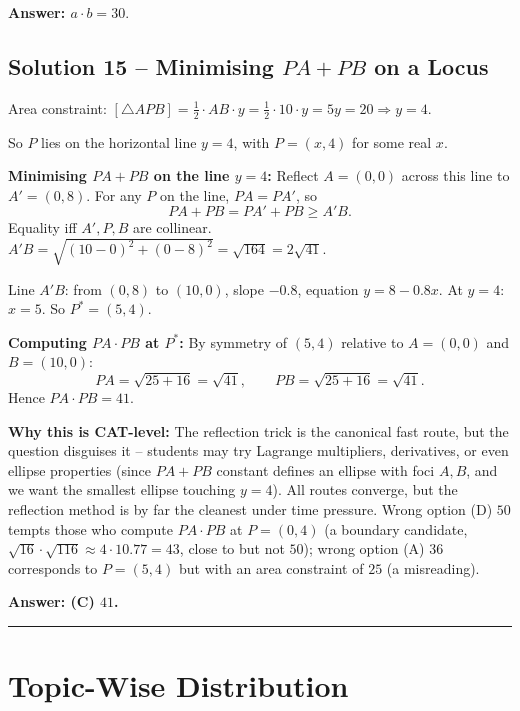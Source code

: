 \documentclass[11pt,a4paper]{article}
\begin{document}
\textbf{Answer: $a\cdot b = 30.$}

\medskip

\subsection*{Solution 15 -- Minimising $PA+PB$ on a Locus}
Area constraint: $[\triangle APB] = \tfrac{1}{2}\cdot AB \cdot y = \tfrac{1}{2}\cdot 10\cdot y = 5y = 20 \Rightarrow y = 4.$

So $P$ lies on the horizontal line $y=4$, with $P=(x,4)$ for some real $x$.

\textbf{Minimising $PA+PB$ on the line $y=4$:} Reflect $A=(0,0)$ across this line to $A'=(0,8)$. For any $P$ on the line, $PA = PA'$, so
\[
PA + PB = PA' + PB \ge A'B.
\]
Equality iff $A', P, B$ are collinear. $A'B = \sqrt{(10-0)^{2} + (0-8)^{2}} = \sqrt{164} = 2\sqrt{41}.$

Line $A'B$: from $(0,8)$ to $(10,0)$, slope $-0.8$, equation $y = 8 - 0.8x.$ At $y=4$: $x = 5.$ So $P^{*} = (5,4).$

\textbf{Computing $PA\cdot PB$ at $P^{*}$:} By symmetry of $(5,4)$ relative to $A=(0,0)$ and $B=(10,0)$:
\[
PA = \sqrt{25+16} = \sqrt{41}, \qquad PB = \sqrt{25+16} = \sqrt{41}.
\]
Hence $PA\cdot PB = 41.$

\textbf{Why this is CAT-level:} The reflection trick is the canonical fast route, but the question disguises it -- students may try Lagrange multipliers, derivatives, or even ellipse properties (since $PA+PB$ constant defines an ellipse with foci $A,B$, and we want the smallest ellipse touching $y=4$). All routes converge, but the reflection method is by far the cleanest under time pressure. Wrong option (D) $50$ tempts those who compute $PA \cdot PB$ at $P=(0,4)$ (a boundary candidate, $\sqrt{16}\cdot\sqrt{116}\approx 4\cdot 10.77 = 43$, close to but not $50$); wrong option (A) $36$ corresponds to $P=(5,4)$ but with an area constraint of $25$ (a misreading).

\textbf{Answer: (C) $41$.}

\vspace{0.6em}\hrule\vspace{0.6em}

\section*{Topic-Wise Distribution}
\end{document}
